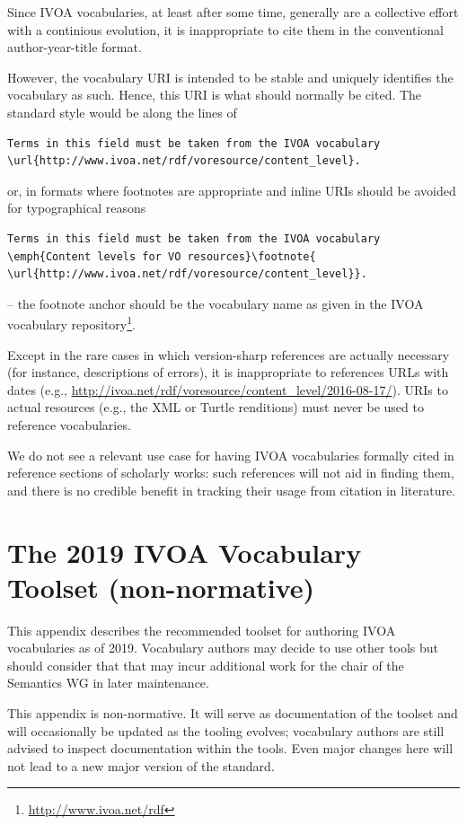 \documentclass[11pt,a4paper]{ivoa}
\begin{document}
Since IVOA vocabularies, at least after some time, generally are a
collective effort with a continious evolution, it is inappropriate to
cite them in the conventional author-year-title format.

However, the vocabulary URI is intended to be stable and uniquely
identifies the vocabulary as such.  Hence, this URI is what should
normally be cited.  The standard style would be along the lines of
\begin{lstlisting}[language={}]
Terms in this field must be taken from the IVOA vocabulary
\url{http://www.ivoa.net/rdf/voresource/content_level}.
\end{lstlisting}
or, in formats where footnotes are appropriate and inline URIs should be
avoided for typographical reasons
\begin{lstlisting}[language={}]
Terms in this field must be taken from the IVOA vocabulary
\emph{Content levels for VO resources}\footnote{
\url{http://www.ivoa.net/rdf/voresource/content_level}}.
\end{lstlisting}
-- the footnote anchor should be the vocabulary name as given in the
IVOA vocabulary repository\footnote{\url{http://www.ivoa.net/rdf}}.

Except in the rare cases in which version-sharp references are actually
necessary (for instance, descriptions of errors), it is inappropriate to
references URLs with dates (e.g.,
\url{http://ivoa.net/rdf/voresource/content_level/2016-08-17/}).  URIs
to actual resources (e.g., the XML or Turtle renditions) must never be
used to reference vocabularies.

We do not see a relevant use case for having IVOA vocabularies formally
cited in reference sections of scholarly works: such references will not
aid in finding them, and there is no credible benefit in tracking their
usage from citation in literature.


\appendix
\section{The 2019 IVOA Vocabulary Toolset (non-normative)}
\label{app:tools}

This appendix describes the recommended toolset for authoring IVOA
vocabularies as of 2019.  Vocabulary authors may decide to use other
tools but should consider that that may incur additional work for the
chair of the Semantics WG in later maintenance.

This appendix is non-normative.  It will serve as documentation of the
toolset and will occasionally be updated as the tooling evolves;
vocabulary authors are still advised to inspect documentation within the
tools.  Even major changes here will not lead to a new major version of
the standard.
\end{document}
